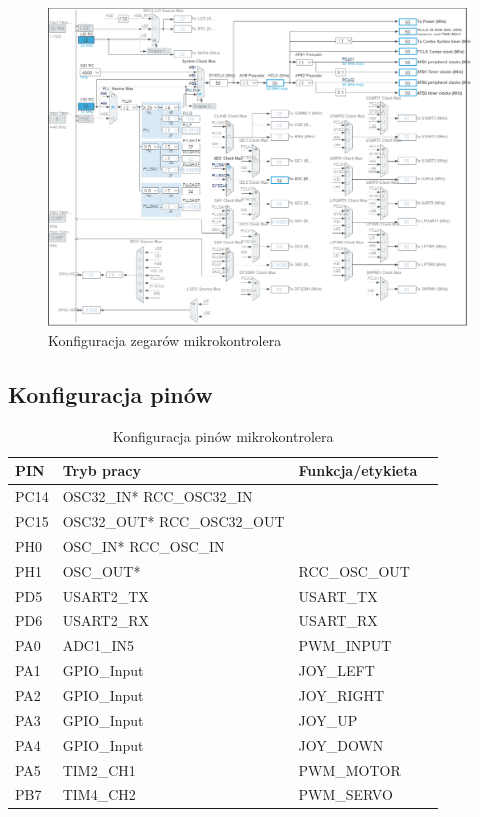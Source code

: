 \documentclass[10pt, a4paper]{article}
\begin{document}
\newpage
\begin{figure}[H]
	\centering
	\includegraphics[width=0.9\textheight,angle=90]{figures/zegar.png}
	\caption{Konfiguracja zegarów mikrokontrolera}
	\label{fig:KonfiguracjaZegara}
\end{figure}

\subsection{Konfiguracja pinów}

\begin{table}[H]
	\centering
	\begin{tabular}{|l|l|l|l|}
		\hline
		PIN & Tryb pracy & Funkcja/etykieta\\
		\hline
		PC14 & OSC32\_IN*	RCC\_OSC32\_IN	&\\
		PC15 & OSC32\_OUT*	RCC\_OSC32\_OUT	&\\
		PH0&  OSC\_IN*	RCC\_OSC\_IN	&\\
		PH1&  OSC\_OUT*&		RCC\_OSC\_OUT	\\
		PD5&	USART2\_TX&	USART\_TX\\
		PD6&	USART2\_RX&	USART\_RX\\
		PA0&	ADC1\_IN5&	PWM\_INPUT\\
		PA1&	GPIO\_Input&	JOY\_LEFT\\
		PA2&	GPIO\_Input&	JOY\_RIGHT\\
		PA3&	GPIO\_Input&	JOY\_UP\\
		PA4& GPIO\_Input& JOY\_DOWN\\
		PA5&	TIM2\_CH1&	PWM\_MOTOR\\
		PB7&    TIM4\_CH2&	PWM\_SERVO\\
		
		
		\hline
	\end{tabular}
	\caption{Konfiguracja pinów mikrokontrolera}
\end{table}
\end{document}
